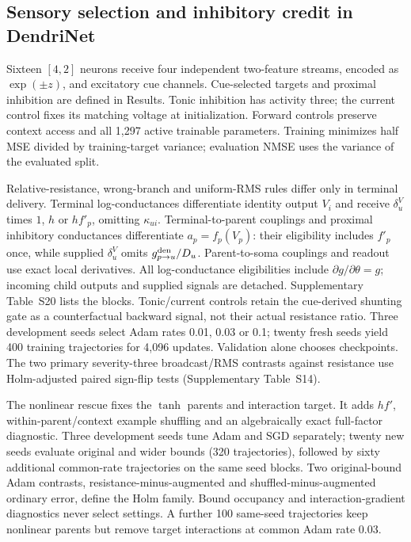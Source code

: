 \documentclass[11pt]{article}
\begin{document}
\subsection*{Sensory selection and inhibitory credit in DendriNet}

Sixteen $[4,2]$ neurons receive four independent two-feature streams, encoded as $\exp(\pm z)$, and excitatory cue channels. Cue-selected targets and proximal inhibition are defined in Results. Tonic inhibition has activity three; the current control fixes its matching voltage at initialization. Forward controls preserve context access and all 1,297 active trainable parameters. Training minimizes half MSE divided by training-target variance; evaluation NMSE uses the variance of the evaluated split.

Relative-resistance, wrong-branch and uniform-RMS rules differ only in terminal delivery. Terminal log-conductances differentiate identity output $V_i$ and receive $\delta_u^V$ times $1$, $h$ or $hf'_p$, omitting $\kappa_{ui}$. Terminal-to-parent couplings and proximal inhibitory conductances differentiate $a_p=f_p(V_p)$: their eligibility includes $f'_p$ once, while supplied $\delta_u^V$ omits $g_{p\to u}^{\rm den}/D_u$. Parent-to-soma couplings and readout use exact local derivatives. All log-conductance eligibilities include $\partial g/\partial\theta=g$; incoming child outputs and supplied signals are detached. Supplementary Table~S20 lists the blocks. Tonic/current controls retain the cue-derived shunting gate as a counterfactual backward signal, not their actual resistance ratio. Three development seeds select Adam rates 0.01, 0.03 or 0.1; twenty fresh seeds yield 400 training trajectories for 4,096 updates. Validation alone chooses checkpoints. The two primary severity-three broadcast/RMS contrasts against resistance use Holm-adjusted paired sign-flip tests (Supplementary Table~S14).

The nonlinear rescue fixes the $\tanh$ parents and interaction target. It adds $hf'$, within-parent/context example shuffling and an algebraically exact full-factor diagnostic. Three development seeds tune Adam and SGD separately; twenty new seeds evaluate original and wider bounds (320 trajectories), followed by sixty additional common-rate trajectories on the same seed blocks. Two original-bound Adam contrasts, resistance-minus-augmented and shuffled-minus-augmented ordinary error, define the Holm family. Bound occupancy and interaction-gradient diagnostics never select settings. A further 100 same-seed trajectories keep nonlinear parents but remove target interactions at common Adam rate 0.03.
\end{document}
